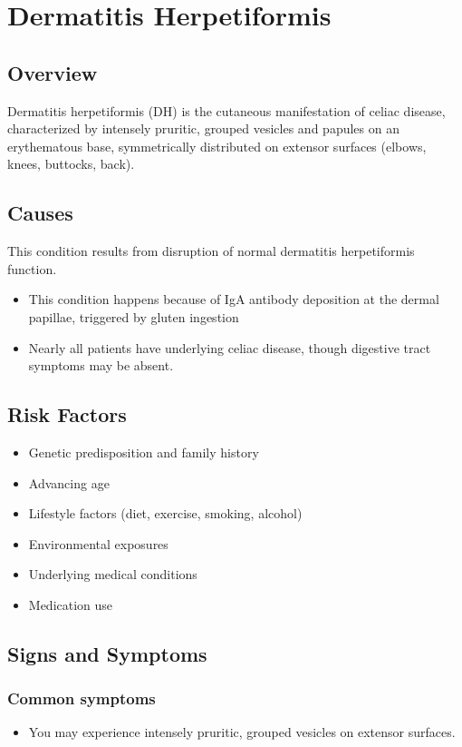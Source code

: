 \chapter{Dermatitis Herpetiformis}
\label{sec:Dermatitis Herpetiformis}

\section{Overview}
Dermatitis herpetiformis (DH) is the cutaneous manifestation of celiac disease, characterized by intensely pruritic, grouped vesicles and papules on an erythematous base, symmetrically distributed on extensor surfaces (elbows, knees, buttocks, back).
\section{Causes}
This condition results from disruption of normal dermatitis herpetiformis function.

\begin{itemize}[noitemsep]
  \item This condition happens because of IgA antibody deposition at the dermal papillae, triggered by gluten ingestion
  \item Nearly all patients have underlying celiac disease, though digestive tract symptoms may be absent.
\end{itemize}
\section{Risk Factors}


\begin{itemize}[noitemsep]
  \item Genetic predisposition and family history
  \item Advancing age
  \item Lifestyle factors (diet, exercise, smoking, alcohol)
  \item Environmental exposures
  \item Underlying medical conditions
  \item Medication use
\end{itemize}
\section{Signs and Symptoms}

\subsection{Common symptoms}
\begin{itemize}[noitemsep]
  \item You may experience intensely pruritic, grouped vesicles on extensor surfaces. 
  \end{itemize}


